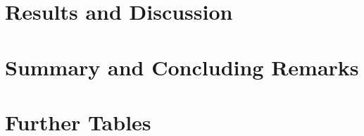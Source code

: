 \documentclass[12pt,a4paper]{article}
\begin{document}
\section{Results and Discussion}
\clearpage
\section{Summary and Concluding Remarks}
\clearpage


\setcounter{page}{\thesavepage}
\pagestyle{plain}


\clearpage

\appendix
\section{Further Tables}
\end{document}
